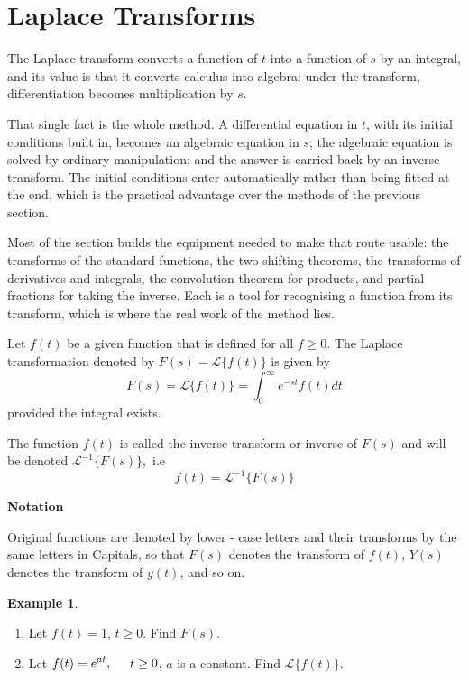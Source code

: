 \documentclass[11pt,a4paper]{article}
\theoremstyle{definition}
\newtheorem{exa}[thm]{Example}
\newcommand{\subhead}[1]{%
  \par\medskip\noindent\textbf{#1}\par\nobreak\smallskip}
\begin{document}
{\color[wave]{485} \section{Laplace Transforms}}

The Laplace transform converts a function of $t$ into a function of $s$ by an
integral, and its value is that it converts calculus into algebra: under the
transform, differentiation becomes multiplication by $s$.

That single fact is the whole method. A differential equation in $t$, with its
initial conditions built in, becomes an algebraic equation in $s$; the algebraic
equation is solved by ordinary manipulation; and the answer is carried back by
an inverse transform. The initial conditions enter automatically rather than
being fitted at the end, which is the practical advantage over the methods of
the previous section.

Most of the section builds the equipment needed to make that route usable: the
transforms of the standard functions, the two shifting theorems, the transforms
of derivatives and integrals, the convolution theorem for products, and partial
fractions for taking the inverse. Each is a tool for recognising a function from
its transform, which is where the real work of the method lies.

Let $f(t)$ be a given function that is defined for all $f\geq 0$. The Laplace transformation denoted by $F(s) = \mathcal{L}\{f(t)\}$ is given by $$F(s) = \mathcal{L}\{f(t)\} = \int_0^{\infty}e^{-st}f(t)dt$$ provided the integral exists.


The function $f(t)$ is called the inverse transform or inverse of $F(s)$ and will be denoted $\mathcal{L}^{-1}\{F(s)\},$ i.e $$f(t) = \mathcal{L}^{-1}\{F(s)\}$$


\subhead{Notation}


Original functions are denoted by lower - case letters and their transforms by the same letters in Capitals, so that $F(s)$ denotes the transform of $f(t)$, $Y(s)$ denotes the transform of $y(t)$, and so on.


\begin{exa}
\begin{enumerate}
\item Let $f(t) = 1$, $t\geq 0$. Find $F(s)$.
\item Let $\displaystyle{f(t) = e^{at},\hspace{0.5cm} t\geq 0}$, $a$ is a constant. Find $\mathcal{L}\{f(t)\}$.
\end{enumerate}
\end{exa}
\end{document}
